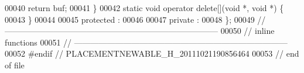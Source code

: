 \begin{DoxyCode}
00040         \textcolor{keywordflow}{return} buf;
00041     \}
00042     \textcolor{keyword}{static} \textcolor{keywordtype}{void} operator delete[](\textcolor{keywordtype}{void} *, \textcolor{keywordtype}{void} *) \{
00043     \}
00044     
00045 \textcolor{keyword}{protected} :
00046 
00047 \textcolor{keyword}{private} :
00048 \};
00049 \textcolor{comment}{//
      ------------------------------------------------------------------------------}
00050 \textcolor{comment}{// inline functions}
00051 \textcolor{comment}{//
      ------------------------------------------------------------------------------}
00052 \textcolor{preprocessor}{#endif // PLACEMENTNEWABLE\_H\_20111021190856464}
00053 \textcolor{preprocessor}{}\textcolor{comment}{// end of file}
\end{DoxyCode}
